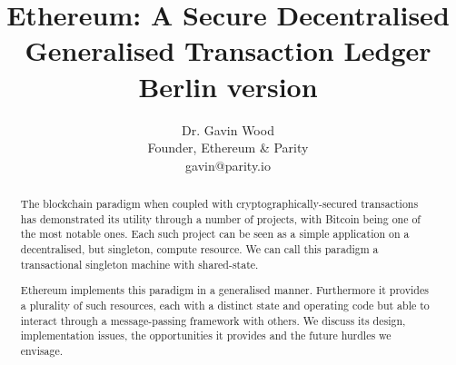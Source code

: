 \documentclass[9pt,oneside]{amsart}
\title[Ethereum: A Secure Decentralised Generalised Transaction Ledger\\ \smaller \textbf{{Berlin version}}]{Ethereum: A Secure Decentralised Generalised Transaction Ledger \\ \smaller \textbf{{Berlin version \YellowPaperVersionNumber}}}
\author{
    Dr. Gavin Wood\\
    Founder, Ethereum \& Parity\\
    gavin@parity.io
}
\begin{document}
\pagecolor{pagecolor}

\begin{abstract}
The blockchain paradigm when coupled with cryptographically-secured transactions has demonstrated its utility through a number of projects, with Bitcoin being one of the most notable ones. Each such project can be seen as a simple application on a decentralised, but singleton, compute resource. We can call this paradigm a transactional singleton machine with shared-state.

Ethereum implements this paradigm in a generalised manner. Furthermore it provides a plurality of such resources, each with a distinct state and operating code but able to interact through a message-passing framework with others. We discuss its design, implementation issues, the opportunities it provides and the future hurdles we envisage.
\end{abstract}

\maketitle
\end{document}
